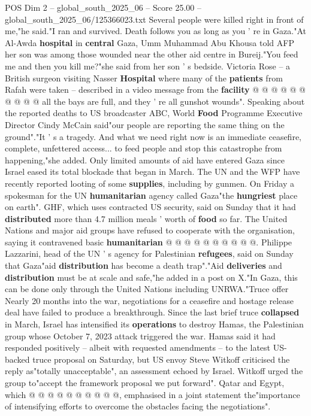 \begin{textsample}{POS Dim 2 – global\_south\_2025\_06 – Score 25.00 – global\_south\_2025\_06/125366023.txt}
Several people were killed right in front of me,"he said."I ran and survived.
Death follows you as long as you ' re in Gaza."At Al-Awda \textbf{hospital} in \textbf{central} Gaza, Umm Muhammad Abu Khousa told AFP her son was among those wounded near the other aid centre in Bureij."You feed me and then you kill me?"she said from her son ' s bedside.
Victoria Rose -- a British surgeon visiting Nasser \textbf{Hospital} where many of the \textbf{patients} from Rafah were taken -- described in a video message from the \textbf{facility} @ @ @ @ @ @ @ @ @ @ all the bays are full, and they ' re all gunshot wounds".
Speaking about the reported deaths to US broadcaster ABC, World \textbf{Food} Programme Executive Director Cindy McCain said"our people are reporting the same thing on the ground"."It ' s a tragedy.
And what we need right now is an immediate ceasefire, complete, unfettered access... to feed people and stop this catastrophe from happening,"she added.
Only limited amounts of aid have entered Gaza since Israel eased its total blockade that began in March.
The UN and the WFP have recently reported looting of some \textbf{supplies}, including by gunmen.
On Friday a spokesman for the UN \textbf{humanitarian} agency called Gaza"the \textbf{hungriest} place on earth".
GHF, which uses contracted US security, said on Sunday that it had \textbf{distributed} more than 4.7 million meals ' worth of \textbf{food} so far.
The United Nations and major aid groups have refused to cooperate with the organisation, saying it contravened basic \textbf{humanitarian} @ @ @ @ @ @ @ @ @ @.
Philippe Lazzarini, head of the UN ' s agency for Palestinian \textbf{refugees}, said on Sunday that Gaza"aid \textbf{distribution} has become a death trap"."Aid \textbf{deliveries} and \textbf{distribution} must be at scale and safe,"he added in a post on X."In Gaza, this can be done only through the United Nations including UNRWA."Truce offer Nearly 20 months into the war, negotiations for a ceasefire and hostage release deal have failed to produce a breakthrough.
Since the last brief truce \textbf{collapsed} in March, Israel has intensified its \textbf{operations} to destroy Hamas, the Palestinian group whose October 7, 2023 attack triggered the war.
Hamas said it had responded positively -- albeit with requested amendments -- to the latest US-backed truce proposal on Saturday, but US envoy Steve Witkoff criticised the reply as"totally unacceptable", an assessment echoed by Israel.
Witkoff urged the group to"accept the framework proposal we put forward".
Qatar and Egypt, which @ @ @ @ @ @ @ @ @ @, emphasised in a joint statement the"importance of intensifying efforts to overcome the obstacles facing the negotiations".

\end{textsample}
